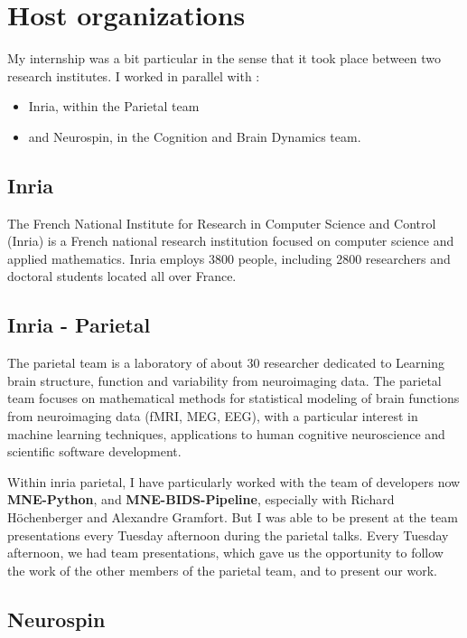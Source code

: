
\chapter*{Host organizations}

My internship was a bit particular in the sense that it took place between two research institutes. I worked in parallel with :
\begin{itemize}
    \item Inria, within the Parietal team
    \item and Neurospin, in the Cognition and Brain Dynamics team.
\end{itemize} 

\section*{Inria}

The French National Institute for Research in Computer Science and Control (Inria) is a French national research institution focused on computer science and applied mathematics. Inria employs 3800 people, including 2800 researchers and doctoral students located all over France.

\section*{Inria - Parietal}

The parietal team is a laboratory of about 30 researcher dedicated to Learning brain structure, function and variability from neuroimaging data. The parietal team focuses on mathematical methods for statistical modeling of brain functions from neuroimaging data (fMRI, MEG, EEG), with a particular interest in machine learning techniques, applications to human cognitive neuroscience and scientific software development.

Within inria parietal, I have particularly worked with the team of developers now \textbf{MNE-Python}, and \textbf{MNE-BIDS-Pipeline}, especially with Richard Höchenberger and Alexandre Gramfort. But I was able to be present at the team presentations every Tuesday afternoon during the parietal talks. Every Tuesday afternoon, we had team presentations, which gave us the opportunity to follow the work of the other members of the parietal team, and to present our work.

\section*{Neurospin}

